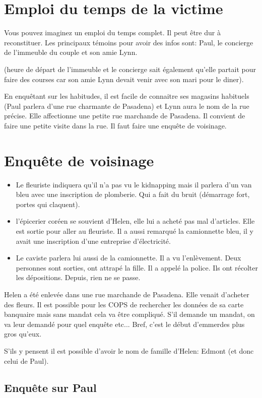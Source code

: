 \documentclass[10pt,a5paper,oneside]{book}
\begin{document}
\section{Emploi du temps de la victime}

Vous pouvez imaginez un emploi du temps complet. Il peut être dur à reconstituer. Les principaux témoins pour avoir des infos sont: Paul, le concierge de l'immeuble du couple et son amie Lynn.

 
(heure de départ de l'immeuble et le concierge sait également qu'elle partait pour faire des courses car son amie Lynn devait venir avec son mari pour le diner). 
 
En enquêtant sur les habitudes, il est facile de connaitre ses magasins habituels (Paul parlera d'une rue charmante de Pasadena) et Lynn aura le nom de la rue précise. Elle affectionne une petite rue marchande de Pasadena. Il convient de faire une petite visite dans la rue. Il faut faire une enquête de voisinage.


\section{Enquête de voisinage}
\begin{itemize}
\item Le fleuriste indiquera qu'il n'a pas vu le kidnapping mais il parlera d'un van bleu avec une inscription de plomberie. Qui a fait du bruit (démarrage fort, portes qui claquent).
\item l’épicerier coréen se souvient d’Helen, elle lui a acheté pas mal d'articles. Elle est sortie pour aller au fleuriste. Il a aussi remarqué la camionnette bleu, il y avait une inscription d'une entreprise d'électricité.
\item Le caviste parlera lui aussi de la camionnette. Il a vu l'enlèvement. Deux personnes sont sorties, ont attrapé la fille. Il a appelé la police. Ils ont récolter les dépositions. Depuis, rien ne se passe. 
\end{itemize}
Helen a été enlevée dans une rue marchande de Pasadena. Elle venait d’acheter des fleurs. 
Il est possible pour les COPS de rechercher les données de sa carte banquaire mais sans mandat 
cela va être compliqué. S'il demande un mandat, on va leur demandé pour quel enquête etc...
Bref, c'est le début d’emmerdes plus gros qu'eux.

S'ils y pensent il est possible d'avoir le nom de famille d’Helen: Edmont (et donc celui de Paul).

\subsection{Enquête sur Paul}
\end{document}
